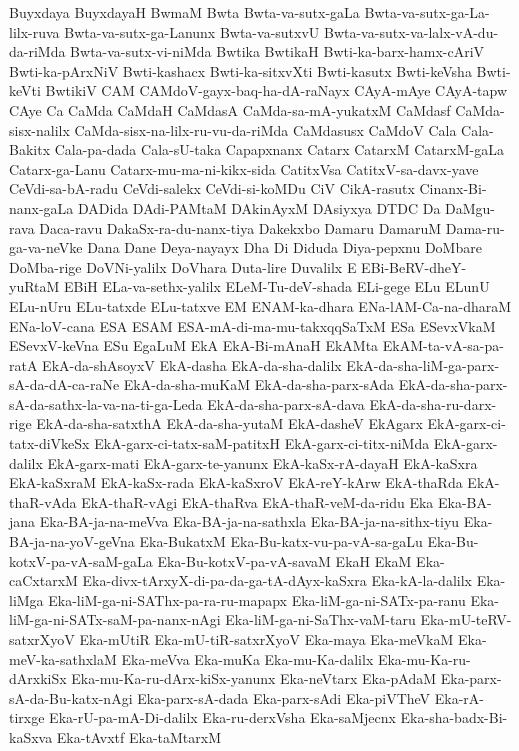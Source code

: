 {Buyxdaya
BuyxdayaH
BwmaM
Bwta
Bwta-va-sutx-gaLa
Bwta-va-sutx-ga-La-lilx-ruva
Bwta-va-sutx-ga-Lanunx
Bwta-va-sutxvU
Bwta-va-sutx-va-lalx-vA-du-da-riMda
Bwta-va-sutx-vi-niMda
Bwtika
BwtikaH
Bwti-ka-barx-hamx-cAriV
Bwti-ka-pArxNiV
Bwti-kashacx
Bwti-ka-sitxvXti
Bwti-kasutx
Bwti-keVsha
Bwti-keVti
BwtikiV
CAM
CAMdoV-gayx-baq-ha-dA-raNayx
CAyA-mAye
CAyA-tapw
CAye
Ca
CaMda
CaMdaH
CaMdasA
CaMda-sa-mA-yukatxM
CaMdasf
CaMda-sisx-nalilx
CaMda-sisx-na-lilx-ru-vu-da-riMda
CaMdasusx
CaMdoV
Cala
Cala-Bakitx
Cala-pa-dada
Cala-sU-taka
Capapxnanx
Catarx
CatarxM
CatarxM-gaLa
Catarx-ga-Lanu
Catarx-mu-ma-ni-kikx-sida
CatitxVsa
CatitxV-sa-davx-yave
CeVdi-sa-bA-radu
CeVdi-salekx
CeVdi-si-koMDu
CiV
CikA-rasutx
Cinanx-Bi-nanx-gaLa
DADida
DAdi-PAMtaM
DAkinAyxM
DAsiyxya
DTDC
Da
DaMgu-rava
Daca-ravu
DakaSx-ra-du-nanx-tiya
Dakekxbo
Damaru
DamaruM
Dama-ru-ga-va-neVke
Dana
Dane
Deya-nayayx
Dha
Di
Diduda
Diya-pepxnu
DoMbare
DoMba-rige
DoVNi-yalilx
DoVhara
Duta-lire
Duvalilx
E
EBi-BeRV-dheY-yuRtaM
EBiH
ELa-va-sethx-yalilx
ELeM-Tu-deV-shada
ELi-gege
ELu
ELunU
ELu-nUru
ELu-tatxde
ELu-tatxve
EM
ENAM-ka-dhara
ENa-lAM-Ca-na-dharaM
ENa-loV-cana
ESA
ESAM
ESA-mA-di-ma-mu-takxqqSaTxM
ESa
ESevxVkaM
ESevxV-keVna
ESu
EgaLuM
EkA
EkA-Bi-mAnaH
EkAMta
EkAM-ta-vA-sa-pa-ratA
EkA-da-shAsoyxV
EkA-dasha
EkA-da-sha-dalilx
EkA-da-sha-liM-ga-parx-sA-da-dA-ca-raNe
EkA-da-sha-muKaM
EkA-da-sha-parx-sAda
EkA-da-sha-parx-sA-da-sathx-la-va-na-ti-ga-Leda
EkA-da-sha-parx-sA-dava
EkA-da-sha-ru-darx-rige
EkA-da-sha-satxthA
EkA-da-sha-yutaM
EkA-dasheV
EkAgarx
EkA-garx-ci-tatx-diVkeSx
EkA-garx-ci-tatx-saM-patitxH
EkA-garx-ci-titx-niMda
EkA-garx-dalilx
EkA-garx-mati
EkA-garx-te-yanunx
EkA-kaSx-rA-dayaH
EkA-kaSxra
EkA-kaSxraM
EkA-kaSx-rada
EkA-kaSxroV
EkA-reY-kArw
EkA-thaRda
EkA-thaR-vAda
EkA-thaR-vAgi
EkA-thaRva
EkA-thaR-veM-da-ridu
Eka
Eka-BA-jana
Eka-BA-ja-na-meVva
Eka-BA-ja-na-sathxla
Eka-BA-ja-na-sithx-tiyu
Eka-BA-ja-na-yoV-geVna
Eka-BukatxM
Eka-Bu-katx-vu-pa-vA-sa-gaLu
Eka-Bu-kotxV-pa-vA-saM-gaLa
Eka-Bu-kotxV-pa-vA-savaM
EkaH
EkaM
Eka-caCxtarxM
Eka-divx-tArxyX-di-pa-da-ga-tA-dAyx-kaSxra
Eka-kA-la-dalilx
Eka-liMga
Eka-liM-ga-ni-SAThx-pa-ra-ru-mapapx
Eka-liM-ga-ni-SATx-pa-ranu
Eka-liM-ga-ni-SATx-saM-pa-nanx-nAgi
Eka-liM-ga-ni-SaThx-vaM-taru
Eka-mU-teRV-satxrXyoV
Eka-mUtiR
Eka-mU-tiR-satxrXyoV
Eka-maya
Eka-meVkaM
Eka-meV-ka-sathxlaM
Eka-meVva
Eka-muKa
Eka-mu-Ka-dalilx
Eka-mu-Ka-ru-dArxkiSx
Eka-mu-Ka-ru-dArx-kiSx-yanunx
Eka-neVtarx
Eka-pAdaM
Eka-parx-sA-da-Bu-katx-nAgi
Eka-parx-sA-dada
Eka-parx-sAdi
Eka-piVTheV
Eka-rA-tirxge
Eka-rU-pa-mA-Di-dalilx
Eka-ru-derxVsha
Eka-saMjecnx
Eka-sha-badx-Bi-kaSxva
Eka-tAvxtf
Eka-taMtarxM
}
